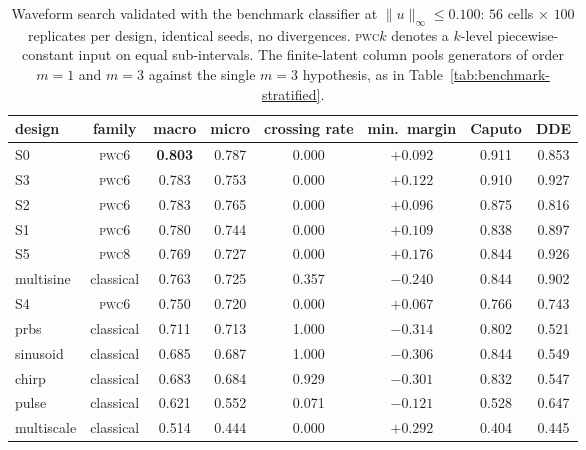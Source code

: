 \begin{table}[htbp]
\centering
\caption{Waveform search validated with the benchmark classifier at $\|u\|_\infty\le0.100$: $56$ cells $\times$ $100$ replicates per design, identical seeds, no divergences. \textsc{pwc}$k$ denotes a $k$-level piecewise-constant input on equal sub-intervals. The finite-latent column pools generators of order $m=1$ and $m=3$ against the single $m=3$ hypothesis, as in Table~\ref{tab:benchmark-stratified}.}
\label{tab:safe-search}
\small
\begin{tabular}{lccccccc}
\hline
design & family & macro & micro & crossing rate & min.\ margin & Caputo & DDE\\
\hline
S0 & \textsc{pwc}6 & \textbf{0.803} & 0.787 & 0.000 & $+0.092$ & 0.911 & 0.853\\
S3 & \textsc{pwc}6 & 0.783 & 0.753 & 0.000 & $+0.122$ & 0.910 & 0.927\\
S2 & \textsc{pwc}6 & 0.783 & 0.765 & 0.000 & $+0.096$ & 0.875 & 0.816\\
S1 & \textsc{pwc}6 & 0.780 & 0.744 & 0.000 & $+0.109$ & 0.838 & 0.897\\
S5 & \textsc{pwc}8 & 0.769 & 0.727 & 0.000 & $+0.176$ & 0.844 & 0.926\\
multisine & classical & 0.763 & 0.725 & 0.357 & $-0.240$ & 0.844 & 0.902\\
S4 & \textsc{pwc}6 & 0.750 & 0.720 & 0.000 & $+0.067$ & 0.766 & 0.743\\
prbs & classical & 0.711 & 0.713 & 1.000 & $-0.314$ & 0.802 & 0.521\\
sinusoid & classical & 0.685 & 0.687 & 1.000 & $-0.306$ & 0.844 & 0.549\\
chirp & classical & 0.683 & 0.684 & 0.929 & $-0.301$ & 0.832 & 0.547\\
pulse & classical & 0.621 & 0.552 & 0.071 & $-0.121$ & 0.528 & 0.647\\
multiscale & classical & 0.514 & 0.444 & 0.000 & $+0.292$ & 0.404 & 0.445\\
\hline
\end{tabular}
\end{table}

